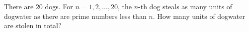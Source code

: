 There are $20$ dogs. For $n=1,2,\dots,20$, the $n$-th dog steals as many units of dogwater as there are prime numbers less than $n$. How many units of dogwater are stolen in total?

